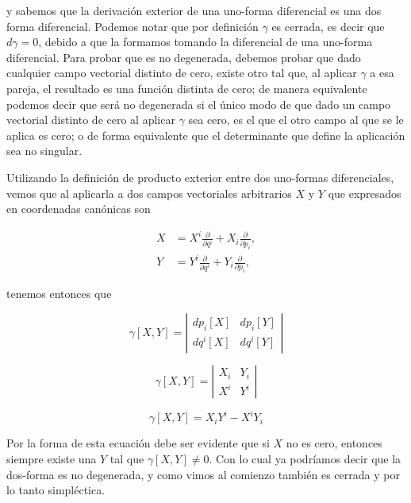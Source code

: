 \documentclass[a4paper,10pt]{article}
\numberwithin{equation}{section}
\begin{document}
y sabemos que la derivación exterior de una uno-forma diferencial es una dos forma 
diferencial. Podemos notar que por definición $\gamma$ es cerrada, es decir que 
$d\gamma = 0$, debido a que la formamos tomando la diferencial de una uno-forma 
diferencial. Para probar que es no degenerada, debemos probar que dado cualquier 
campo vectorial distinto de cero, existe otro tal que, al aplicar $\gamma$ a esa pareja, 
el resultado es una función distinta de cero; de manera equivalente podemos decir 
que será no degenerada si el único modo de que dado un campo vectorial distinto de 
cero al aplicar $\gamma$ sea cero, es el que el otro campo al que se le aplica 
es cero; o de forma equivalente que el determinante que define la aplicación 
sea no singular. 

\vspace{.3cm}

Utilizando la definición de producto exterior entre dos uno-formas diferenciales, vemos 
que al aplicarla a dos campos vectoriales arbitrarios $X$ y $Y$ que expresados 
en coordenadas canónicas son 

\begin{align}
 X &= X^i\frac{\partial}{\partial q^i} + X_i\frac{\partial}{\partial p_i}, \\
 Y &= Y^i\frac{\partial}{\partial q^i} + Y_i\frac{\partial}{\partial p_i},
\end{align}

tenemos entonces que

\begin{equation}
 \gamma[X,Y] = \left|\begin{matrix}
                dp_i[X] & dp_i[Y] \\
                dq^i[X] & dq^i[Y]
               \end{matrix}\right|
\end{equation}

\begin{equation}
 \gamma[X,Y] = \left|\begin{matrix}
                X_i & Y_i \\
                X^i & Y^i
               \end{matrix}\right|
\end{equation}

\begin{equation}
 \gamma[X,Y] = X_i Y^i - X^iY_i
\end{equation}

Por la forma de esta ecuación debe ser evidente que si $X$ no es cero, entonces 
siempre existe una $Y$ tal que $\gamma[X,Y] \ne 0$. Con lo cual ya podríamos decir 
que la dos-forma es no degenerada, y como vimos al comienzo también es cerrada 
y por lo tanto simpléctica. 
\end{document}
